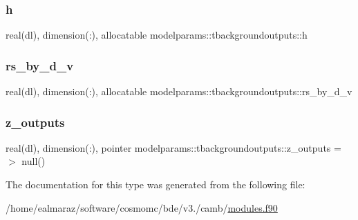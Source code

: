 \subsubsection{\texorpdfstring{h}{h}}
{\footnotesize\ttfamily real(dl), dimension(\+:), allocatable modelparams\+::tbackgroundoutputs\+::h}

\mbox{\label{structmodelparams_1_1tbackgroundoutputs_a90b2aca37fdfed20bdb4168d269efb51}} 
\subsubsection{\texorpdfstring{rs\+\_\+by\+\_\+d\+\_\+v}{rs\_by\_d\_v}}
{\footnotesize\ttfamily real(dl), dimension(\+:), allocatable modelparams\+::tbackgroundoutputs\+::rs\+\_\+by\+\_\+d\+\_\+v}

\mbox{\label{structmodelparams_1_1tbackgroundoutputs_a4dfea44e1d4637c0a0ee1843bd9078cf}} 
\subsubsection{\texorpdfstring{z\+\_\+outputs}{z\_outputs}}
{\footnotesize\ttfamily real(dl), dimension(\+:), pointer modelparams\+::tbackgroundoutputs\+::z\+\_\+outputs =$>$ null()}



The documentation for this type was generated from the following file\+:\begin{DoxyCompactItemize}
\item 
/home/ealmaraz/software/cosmomc/bde/v3./camb/\mbox{\hyperlink{modules_8f90}{modules.\+f90}}\end{DoxyCompactItemize}

